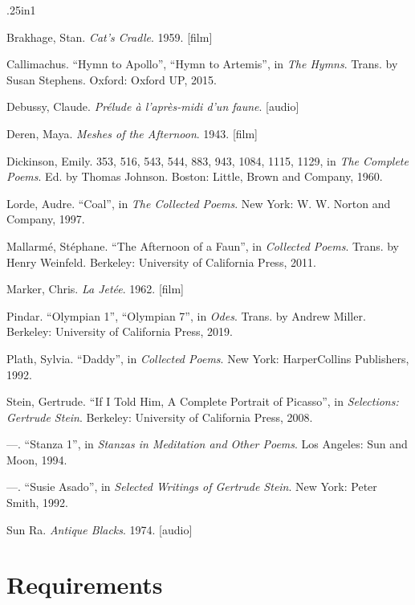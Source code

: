 \documentclass[12pt]{article}
\begin{document}
\begin{hangparas}{.25in}{1} \small{
    Brakhage, Stan. \textit{Cat's Cradle}. 1959. [film]
    
    Callimachus. ``Hymn to Apollo'', ``Hymn to Artemis'', in \textit{The Hymns}. Trans. by Susan Stephens. Oxford: Oxford UP, 2015.
    
    Debussy, Claude. \textit{Pr\'{e}lude \`{a} l'apr\`{e}s-midi d'un faune}. [audio]
    
    Deren, Maya. \textit{Meshes of the Afternoon}. 1943. [film]
    
    Dickinson, Emily. 353, 516, 543, 544, 883, 943, 1084, 1115, 1129, in \textit{The Complete Poems}. Ed. by Thomas Johnson. Boston: Little, Brown and Company, 1960.
    
    Lorde, Audre. ``Coal'', in \textit{The Collected Poems}. New York: W. W. Norton and Company, 1997.
    
    Mallarm\'{e}, St\'{e}phane. ``The Afternoon of a Faun'', in \textit{Collected Poems}. Trans. by Henry Weinfeld. Berkeley: University of California Press, 2011. 
    
    Marker, Chris. \textit{La Jet\'{e}e}. 1962. [film]
    
    Pindar. ``Olympian 1'', ``Olympian 7'', in \textit{Odes}. Trans. by Andrew Miller. Berkeley: University of California Press, 2019. 
    
    Plath, Sylvia. ``Daddy'', in \textit{ Collected Poems}. New York: HarperCollins Publishers, 1992.
    
    Stein, Gertrude. ``If I Told Him, A Complete Portrait of Picasso'', in \textit{Selections: Gertrude Stein}. Berkeley: University of California Press, 2008.
  
    ---. ``Stanza 1'', in \textit{Stanzas in Meditation and Other Poems}. Los Angeles: Sun and Moon, 1994.
    
    ---. ``Susie Asado'', in \textit{Selected Writings of Gertrude Stein}. New York: Peter Smith, 1992.
    
    Sun Ra. \textit{Antique Blacks}. 1974. [audio]
}
\end{hangparas}
\noindent

\section{Requirements}
\end{document}
